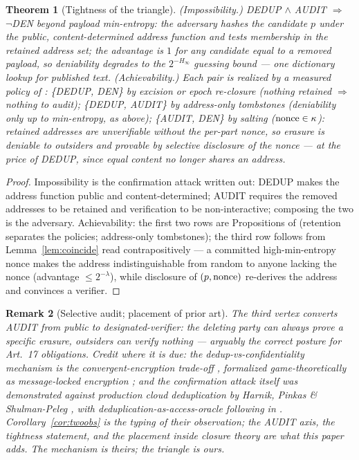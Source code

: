 \documentclass[10pt]{article}
\newtheorem{theorem}{Theorem}
\newtheorem{remark}[theorem]{Remark}
\begin{document}
\begin{theorem}[Tightness of the triangle]\label{thm:triangle}
\emph{(Impossibility.)} DEDUP $\wedge$ AUDIT $\Rightarrow$ $\neg$DEN beyond payload min-entropy: the adversary hashes the candidate $p$ under the public, content-determined address function and tests membership in the retained address set; the advantage is $1$ for any candidate equal to a removed payload, so deniability degrades to the $2^{-H_\infty}$ guessing bound --- one dictionary lookup for published text. \emph{(Achievability.)} Each pair is realized by a measured policy of \cite{deletion}: \{DEDUP, DEN\} by excision or epoch re-closure (nothing retained $\Rightarrow$ nothing to audit); \{DEDUP, AUDIT\} by address-only tombstones (deniability only up to min-entropy, as above); \{AUDIT, DEN\} by salting ($\textnormal{nonce} \in \kappa$): retained addresses are unverifiable without the per-part nonce, so erasure is deniable to outsiders \emph{and} provable by selective disclosure of the nonce --- at the price of DEDUP, since equal content no longer shares an address.
\end{theorem}

\begin{proof}
Impossibility is the confirmation attack written out: DEDUP makes the address function public and content-determined; AUDIT requires the removed addresses to be retained and verification to be non-interactive; composing the two is the adversary. Achievability: the first two rows are Propositions of \cite[\S Erasure]{deletion} (retention separates the policies; address-only tombstones); the third row follows from Lemma~\ref{lem:coincide} read contrapositively --- a committed high-min-entropy nonce makes the address indistinguishable from random to anyone lacking the nonce (advantage $\le 2^{-\lambda}$), while disclosure of $(p, \textnormal{nonce})$ re-derives the address and convinces a verifier.
\end{proof}

\begin{remark}[Selective audit; placement of prior art]\label{rem:selective}
The third vertex converts AUDIT from public to \emph{designated-verifier}: the deleting party can always prove a specific erasure, outsiders can verify nothing --- arguably the correct posture for Art.~17 obligations. Credit where it is due: the dedup-vs-confidentiality mechanism is the convergent-encryption trade-off \cite{Douceur02}, formalized game-theoretically as message-locked encryption \cite{BKR13mle,Bellare13}; and the confirmation attack itself was demonstrated against production cloud deduplication by Harnik, Pinkas \& Shulman-Peleg \cite{Harnik10}, with deduplication-as-access-oracle following in \cite{Halevi11}. Corollary~\ref{cor:twoobs} is the \emph{typing} of their observation; the AUDIT axis, the tightness statement, and the placement inside closure theory are what this paper adds. The mechanism is theirs; the triangle is ours.
\end{remark}
\end{document}
